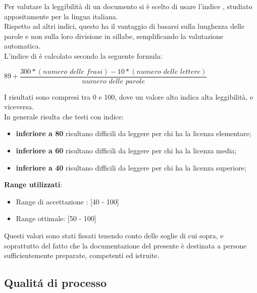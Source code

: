Per valutare la leggibilità di un documento si è scelto di usare l'indice , studiato appositamente per la lingua italiana.\\
Rispetto ad altri indici, questo ha il vantaggio di basarsi sulla lunghezza delle parole e non sulla loro divisione in sillabe, semplificando la valutazione automatica.\\
L'indice di  è calcolato secondo la seguente formula:
\begin{center}
\begin{math}
	89 + 
		\dfrac	{300 * (\textit{numero delle frasi}) - 10 * (\textit{numero delle lettere})}
				{\textit{numero delle parole}}
\end{math}
\end{center}
I risultati sono compresi tra 0 e 100, dove un valore alto indica alta leggibilità, e viceversa. \\
In generale risulta che testi con indice:
\begin{itemize}
	\item \textbf{inferiore a 80} risultano difficili da leggere per chi ha la licenza elementare;
	\item \textbf{inferiore a 60} risultano difficili da leggere per chi ha la licenza media;
	\item \textbf{inferiore a 40} risultano difficili da leggere per chi ha la licenza superiore;
\end{itemize}
\textbf{Range utilizzati}:
\begin{itemize}
	\item Range di accettazione : [40 - 100]
	\item Range ottimale: [50 - 100]
\end{itemize}
Questi valori sono stati fissati tenendo conto delle soglie di cui sopra, e soprattutto del fatto che la documentazione del presente  è destinata a persone sufficientemente preparate, competenti ed istruite.



\subsection{Qualit\'a di processo}
